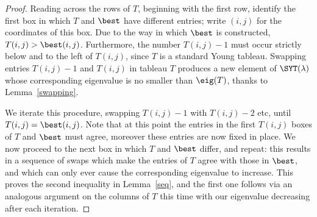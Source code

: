 \documentclass[11pt]{report}
\begin{document}
\begin{proof}
	Reading across the rows of $T$, beginning with the first row, identify the first box in which $T$ and $\best$ have different entries; write $(i,j)$ for the coordinates of this box. Due to the way in which $\best$ is constructed, $T(i,j)>\best(i,j)$. Furthermore, the number $T(i,j)-1$ must occur strictly below and to the left of $T(i,j)$, since $T$ is a standard Young tableau. Swapping entries $T(i,j)-1$ and $T(i,j)$ in tableau $T$ produces a new element of $\SYT(\lambda)$ 
	whose corresponding eigenvalue is no smaller than $\eig(T)$, thanks to Lemma~\ref{swapping}.
	
	We iterate this procedure, swapping $T(i,j)-1$ with 
	$T(i,j)-2$ etc, until $T(i,j) = \best(i,j)$. Note that at this point the 
	entries in the first $T(i,j)$ boxes of $T$ and $\best$ must agree, moreover 
	these entries are now fixed in place. We now 
	proceed to the next box in which $T$ and $\best$ differ, and repeat: this 
	results in a sequence of swaps which make the entries of $T$ agree with 
	those in $\best$, and which can only ever cause the corresponding 
	eigenvalue to increase. This proves the second inequality in 
	Lemma~\ref{seq}, and the first one follows via an analogous argument on the 
	columns of $T$ this time with our eigenvalue decreasing after each iteration.
	
	
	
	
	
	
	
	
	
	
	
	
	
	
	
	
	
	
	
	
	
	
	
	
	
	
	
	
	
	
	
	
	
	
	
	
	
	
	
	
	
	
	
	
	
	
	
	
	
	
	
	
	
	
	
	
	
	
	
	
	
	
	
	
	
	
	
	
	
	
	
	
	
	
	
	
	
	
	
	
	
	
	
	
	
	
	
	
\end{proof}
\end{document}

